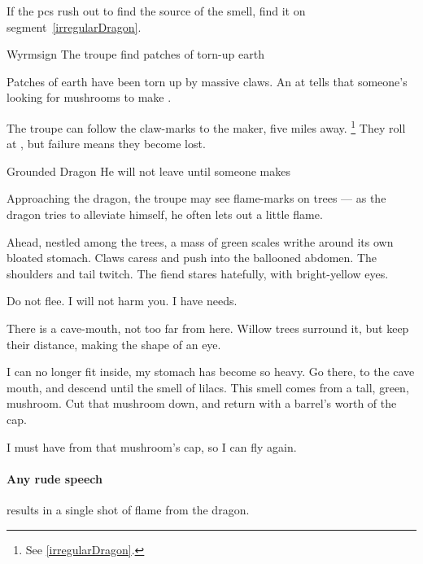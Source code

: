 \documentclass[10pt,twoside]{book}
\begin{document}
If the \glspl{pc} rush out to find the source of the smell, find it on \gls{segment}~\vref{irregularDragon}.


{Wyrmsign}%
{The troupe find patches of torn-up earth}%

Patches of earth have been torn up by massive claws.
An  at \tn[12] tells  that someone's looking for mushrooms to make .

The troupe can follow the claw-marks to the maker, five miles away.%
\footnote{See \vref{irregularDragon}.}
They roll  at \tn[6], but failure means they become lost.

{Grounded Dragon}%
{He will not leave until someone makes }%

\label{irregularDragon}

Approaching the dragon, the troupe may see flame-marks on trees --- as the dragon tries to alleviate himself, he often lets out a little flame.

\begin{boxtext}
  Ahead, nestled among the trees, a mass of green scales writhe around its own bloated stomach.
  Claws caress and push into the ballooned abdomen.
  The shoulders and tail twitch.
  The \gls{fiend} stares hatefully, with bright-yellow eyes.
\end{boxtext}

\begin{speechtext}
  Do not flee.
  I will not harm you.
  I have needs.

  There is a cave-mouth, not too far from here.
  Willow trees surround it, but keep their distance, making the shape of an eye.

  I can no longer fit inside, my stomach has become so heavy.
  Go there, to the cave mouth, and descend until the smell of lilacs.
  This smell comes from a tall, green, mushroom.
  Cut that mushroom down, and return with a barrel's worth of the cap.

  I must have  from that mushroom's cap, so I can fly again.
\end{speechtext}

\paragraph{Any rude speech}
results in a single shot of flame from the dragon.
\end{document}
